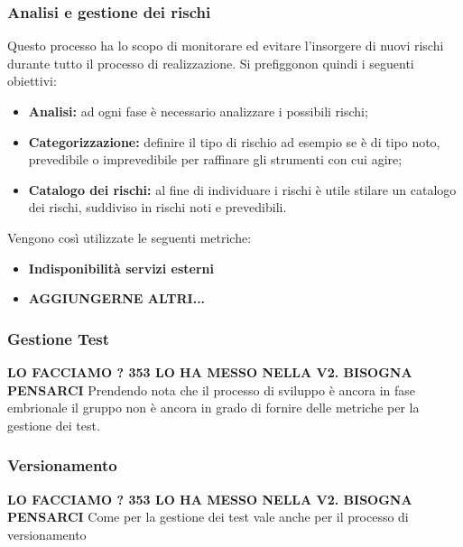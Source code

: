 \subsubsection{Analisi e gestione dei rischi}
Questo processo ha lo scopo di monitorare ed evitare l'insorgere di nuovi rischi durante tutto il processo di realizzazione. Si prefiggonon quindi i seguenti obiettivi:
\begin{itemize}
	\item{\textbf{Analisi:} ad ogni fase è necessario analizzare i possibili rischi;}
	\item{\textbf{Categorizzazione:}  definire il tipo di rischio ad esempio se è di tipo noto, prevedibile o imprevedibile per raffinare gli strumenti con cui agire;}
	\item{\textbf{Catalogo dei rischi:} al fine di individuare i rischi è utile stilare un catalogo dei rischi, suddiviso in rischi noti e prevedibili.}
\end{itemize}
Vengono così utilizzate le seguenti metriche: 
\begin{itemize}
	\item{\textbf{Indisponibilità servizi esterni}}
	\item{\textbf{AGGIUNGERNE ALTRI...}}
\end{itemize}
\begin{table}[!htpb]
\end{table}
\newpage
\subsubsection{Gestione Test}
\textbf{LO FACCIAMO ? 353 LO HA MESSO NELLA V2. BISOGNA PENSARCI}
Prendendo nota che il processo di sviluppo è ancora in fase embrionale il gruppo non è ancora in grado di fornire delle metriche per la gestione dei test.
\subsubsection{Versionamento}
\textbf{LO FACCIAMO ? 353 LO HA MESSO NELLA V2. BISOGNA PENSARCI}
Come per la gestione dei test vale anche per il processo di versionamento